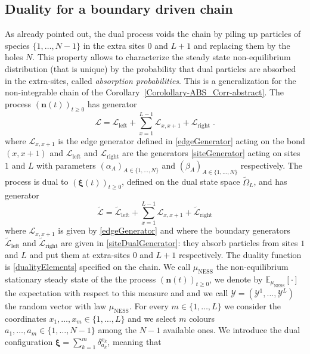 \documentclass[10pt]{article}
\numberwithin{equation}{section}
\numberwithin{equation}{subsection}
\newcommand{\dt}{\;.}
\newcommand{\fra}[1]{\textcolor[rgb]{0,0,1}{#1}}
\begin{document}
{\subsection{Duality for a boundary driven chain}\label{Subsection-ss-nonI}
 As already pointed out, the dual process voids the chain by piling up particles of species $\{1,\ldots,N-1\}$ in the extra sites $0$ and $L+1$ and replacing them by the holes $N$. This property allows to characterize the steady state non-equilibrium distribution (that is unique) by the probability that dual particles are absorbed in the extra-sites, called \textit{absorption probabilities}. This is a generalization for the non-integrable chain of the Corollary~\ref{Corolollary-ABS_Corr-abstract}. The process $\left(\bm{n}(t)\right)_{t\geq0}$ has generator
\begin{equation}
	\mathcal{L}=\mathcal{L}_{\text{left}}+\sum_{x=1}^{L-1}\mathcal{L}_{x,x+1}+\mathcal{L}_{\text{right}}\dt
\end{equation} 
where $\mathcal{L}_{x,x+1}$ is the edge generator defined in \eqref{edgeGenerator} acting on the bond $(x,x+1)$ and $\mathcal{L}_{\text{left}}$ and $\mathcal{L}_{\text{right}}$ are the generators \eqref{siteGenerator} acting on sites $1$ and $L$ with parameters $(\alpha_{A})_{A\in \{1,\ldots,N\}}$ and $(\beta_{A})_{A\in \{1,\ldots,N\}}$ respectively. 
The process is dual to $(\bm{\xi}(t))_{t\geq0}$, defined on the dual state space $\widetilde{\Omega}_{L}$, and has generator
\begin{equation}
	\widetilde{\mathcal{L}}=\widetilde{\mathcal{L}}_{\text{left}}+\sum_{x=1}^{L-1}\mathcal{L}_{x,x+1}+\widetilde{\mathcal{L}}_{\text{right}}
\end{equation} 
where $\mathcal{L}_{x,x+1}$ is given by \fra{\eqref{edgeGenerator}} and where the boundary generators $\widetilde{\mathcal{L}}_{\text{left}}$ and $\widetilde{\mathcal{L}}_{\text{right}}$ are given in \eqref{siteDualGenerator}: they absorb particles from sites $1$ and $L$ and put them at extra-sites $0$ and $L+1$ respectively. The duality function is \eqref{dualityElements} specified on the chain. 
We call $\mu_{\text{NESS}}$ the non-equilibrium stationary steady state of the the process $(\bm{n}(t))_{t\geq 0}$, we denote by $\mathbb{E}_{\mu_{\text{NESS}}}[\cdot]$ the expectation with respect to this measure and and we call $\bm{\mathcal{Y}} = (\mathcal{Y}^{1},\ldots,\mathcal{Y}^{L})$ the random vector with law $\mu_{\text{NESS}}$. For every $m\in\{1,\ldots,L\}$ we consider {\color{black}the coordinates $x_{1},\ldots,x_{m}\in\{1,\ldots,L\}$ and we select $m$ colours $a_{1},\ldots,a_{m}\in \{1,\ldots,N-1\}$ among the $N-1$ available ones}. We introduce the dual configuration  $\bm{\xi}=\sum_{k=1}^{m}\delta_{a_{k}}^{x_{k}}$, meaning that 
}
\end{document}
